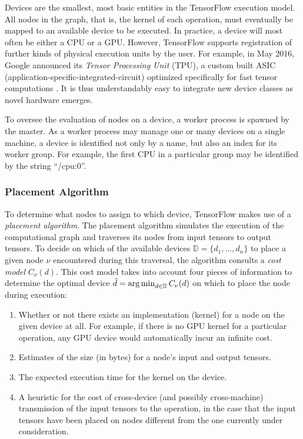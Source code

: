 Devices are the smallest, most basic entities in the TensorFlow execution
model. All nodes in the graph, that is, the kernel of each operation, must
eventually be mapped to an available device to be executed. In practice, a
device will most often be either a CPU or a GPU. However, TensorFlow supports
registration of further kinds of physical execution units by the user. For
example, in May 2016, Google announced its \emph{Tensor Processing Unit} (TPU),
a custom built ASIC (application-specific-integrated-circuit) optimized
specifically for fast tensor computations \cite{tpu}. It is thus understandably
easy to integrate new device classes as novel hardware emerges.

To oversee the evaluation of nodes on a device, a worker process is spawned by
the master. As a worker process may manage one or many devices on a single
machine, a device is identified not only by a name, but also an index for its
worker group. For example, the first CPU in a particular group may be identified
by the string ``/cpu:0''.

\subsubsection{Placement Algorithm}\label{sec:model-exec-placement}

To determine what nodes to assign to which device, TensorFlow makes use of a
\emph{placement algorithm}. The placement algorithm simulates the execution of
the computational graph and traverses its nodes from input tensors to output
tensors. To decide on which of the available devices
$\mathbb{D} = \{d_1, \dots, d_n\}$ to place a given node $\nu$ encountered
during this traversal, the algorithm consults a \emph{cost model}
$C_\nu(d)$. This cost model takes into account four pieces of information to
determine the optimal device $\hat{d} = \operatorname*{arg\,min}_{d \in \mathbb{D}} C_\nu(d)$ on
which to place the node during execution:

\begin{enumerate}
  \item Whether or not there exists an implementation (kernel) for a node on the
    given device at all. For example, if there is no GPU kernel for a particular
    operation, any GPU device would automatically incur an infinite cost.
  \item Estimates of the size (in bytes) for a node's input and output tensors.
  \item The expected execution time for the kernel on the device.
  \item A heuristic for the cost of cross-device (and possibly cross-machine)
    transmission of the input tensors to the operation, in the case that the
    input tensors have been placed on nodes different from the one currently
    under consideration.
\end{enumerate}

